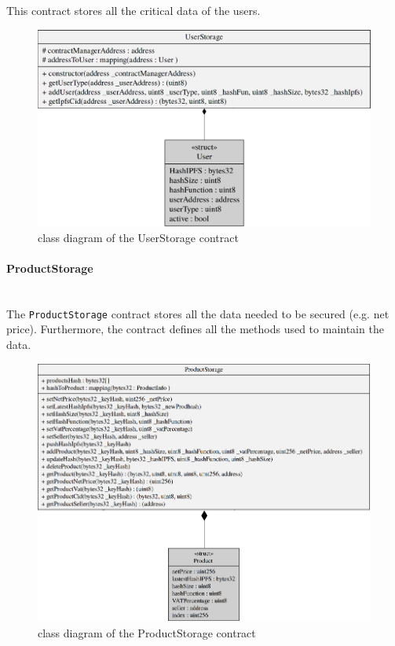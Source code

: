 \noindent This contract stores all the critical data of the users. 
\begin{figure}[H]
	\centering
	\includegraphics[scale=0.25]{res/images/solidity/userstorage.png}
	\caption{class diagram of the UserStorage contract}
\end{figure}
\pagebreak
\paragraph{ProductStorage}\mbox{}\\

\noindent The \texttt{ProductStorage} contract stores all the data needed to be secured (e.g. net price\glo). Furthermore, the contract defines all the methods used to maintain the data. 
\begin{figure}[H]
	\centering
	\includegraphics[scale=0.45]{res/images/solidity/productstorage.png}
	\caption{class diagram of the ProductStorage contract}
\end{figure}
\pagebreak
